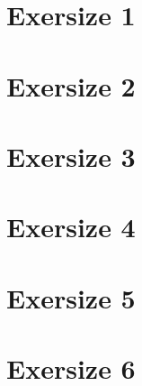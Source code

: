 \documentclass[twoside, a4paper, fleqn, reqno]{article}
\begin{document}
\maketitle

\section*{Exersize 1}

\section*{Exersize 2}

\section*{Exersize 3}

\section*{Exersize 4}

\section*{Exersize 5}

\section*{Exersize 6}
\end{document}
